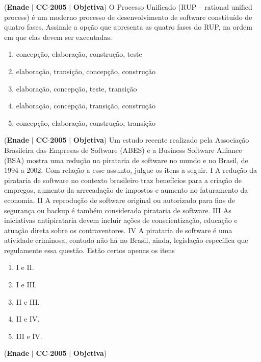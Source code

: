 \documentclass{exam}
\begin{document}
\begin{questions}
\question (\textbf{Enade} $|$ \textbf{CC}-\textbf{2005} $|$ \textbf{Objetiva})
O Processo Unificado (RUP – rational unified process) é um
moderno processo de desenvolvimento de software constituído de
quatro fases. Assinale a opção que apresenta as quatro fases do RUP,
na ordem em que elas devem ser executadas.
	\begin{enumerate}[label=\alph*)]
		\item  concepção, elaboração, construção, teste
		\item  elaboração, transição, concepção, construção
		\item  elaboração, concepção, teste, transição
		\item  elaboração, concepção, transição, construção
		\item  concepção, elaboração, construção, transição
	\end{enumerate}

\question (\textbf{Enade} $|$ \textbf{CC}-\textbf{2005} $|$ \textbf{Objetiva})
Um estudo recente realizado pela Associação Brasileira das
Empresas de Software (ABES) e a Business Software Alliance
(BSA) mostra uma redução na pirataria de software no mundo e no
Brasil, de 1994 a 2002. Com relação a esse assunto, julgue os itens
a seguir.
I A redução da pirataria de software no contexto brasileiro traz
benefícios para a criação de empregos, aumento da arrecadação
de impostos e aumento no faturamento da economia.
II A reprodução de software original ou autorizado para fins de
segurança ou backup é também considerada pirataria de
software.
III As iniciativas antipirataria devem incluir ações de
conscientização, educação e atuação direta sobre os
contraventores.
IV A pirataria de software é uma atividade criminosa, contudo não
há no Brasil, ainda, legislação específica que regulamente essa
questão.
Estão certos apenas os itens
	\begin{enumerate}[label=\alph*)]
		\item  I e II.
		\item  I e III.
		\item  II e III.
		\item  II e IV.
		\item  III e IV.
	\end{enumerate}

\question (\textbf{Enade} $|$ \textbf{CC}-\textbf{2005} $|$ \textbf{Objetiva})


\end{questions}
\end{document}
